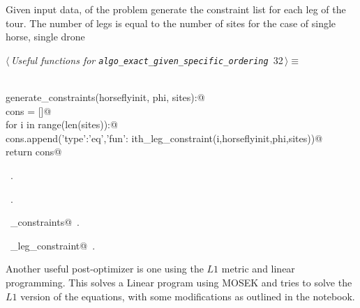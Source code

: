 \documentclass[11.5pt]{report}
\begin{document}
\vspace{-0.8cm} \newchunk Given input data, of the problem generate the constraint list for each leg 
of the tour. The number of legs is equal to the number of sites for the case of single horse, single drone
\begin{flushleft} \small\label{scrap43}\raggedright\small
{} $\langle\,${\itshape Useful functions for \verb|algo_exact_given_specific_ordering|}\nobreak\ {\footnotesize {32}}$\,\rangle\equiv$
\vspace{-1ex}
\begin{list}{}{} \item
\mbox{}\verb@@\\
\mbox{}\verb@def generate_constraints(horseflyinit, phi, sites):@\\
\mbox{}\verb@   cons = []@\\
\mbox{}\verb@   for i in range(len(sites)):@\\
\mbox{}\verb@        cons.append({'type':'eq','fun': ith_leg_constraint(i,horseflyinit,phi,sites)})@\\
\mbox{}\verb@   return cons@\\
\mbox{}\verb@@{\NWsep}
\end{list}
\vspace{-1.5ex}
\footnotesize
\begin{list}{}{\setlength{\itemsep}{-\parsep}\setlength{\itemindent}{-\leftmargin}}
\item \NWtxtMacroDefBy\ .
\item \NWtxtMacroRefIn\ .
\item \NWtxtIdentsDefed\nobreak\  \verb@generate_constraints@\nobreak\ .\item \NWtxtIdentsUsed\nobreak\  \verb@ith_leg_constraint@\nobreak\ .
\item{}
\end{list}
\vspace{4ex}
\end{flushleft}




\vspace{-0.8cm} \newchunk Another useful post-optimizer is one using the $L1$ metric and linear programming. 
This solves a Linear program using MOSEK and tries to solve the 
$L1$ version of the equations, with some modifications as outlined
    in the notebook.
\end{document}
